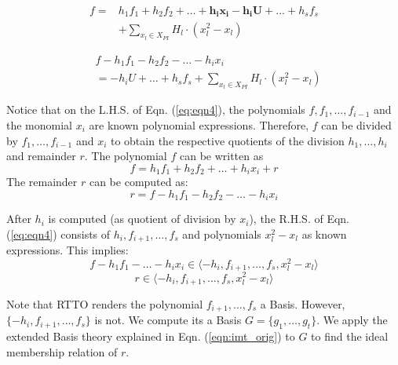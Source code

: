 \begin{equation}
\begin{split}
 f = & h_1f_1 + h_2f_2 + \dots+\boldsymbol{h_ix_i-h_iU}+\dots+h_sf_s \\
 & + \sum_{x_l \in X_{PI}} H_l \cdot(x_l^2-x_l)   
\end{split}
\label{eq:eqn3}
\end{equation}

\begin{equation}
\label{eq:eqn4}
\begin{split}
   & f - h_1f_1 - h_2f_2 - \dots-h_ix_i \\
   & = -h_iU+\dots+h_sf_s + \sum_{x_l \in X_{PI}} H_l \cdot(x_l^2-x_l) 
\end{split}
\end{equation}

Notice that on the L.H.S. of Eqn. (\ref{eq:eqn4}), the polynomials
$f, f_1,\dots,f_{i-1}$ and the monomial $x_i$ are known polynomial expressions. Therefore, $f$ can be divided by $f_1,\dots,f_{i-1}$ and $x_i$ to obtain the respective quotients of the division
$h_1,\dots,h_i$ and remainder $r$. The polynomial $f$ can be written as 
\begin{equation}
f = h_1f_1 + h_2f_2 + \dots + h_ix_i + r
\end{equation}
The remainder $r$ can be computed as:
\begin{equation}
r = f - h_1f_1 - h_2f_2 - \dots - h_ix_i
\label{eq:eqnr}
\end{equation}

After $h_i$ is computed (as quotient of division by $x_i$),
the R.H.S. of Eqn. (\ref{eq:eqn4}) consists of $h_i,f_{i+1},\dots,f_s$ and polynomials $x_l^2-x_l$ as known expressions. This
implies:
\vspace{-1mm}
\begin{equation}
f - h_1f_1 - \dots-h_ix_i \in \langle -h_i,f_{i+1},\dots,f_s,  x_l^2-x_l\rangle
\end{equation}
\vspace{-4mm}
\begin{equation}
r \in \langle -h_i,f_{i+1},\dots,f_s,  x_l^2-x_l\rangle
\label{eq:eqn5}
\end{equation}

Note that RTTO renders the polynomial $f_{i+1},\dots,f_s$ a \Grobner Basis. However, $\{-h_i,f_{i+1},\dots,f_s\}$ is not. We compute its a \Grobner Basis $G = \{g_1,\dots, g_t\}$. We apply the extended \Grobner Basis theory explained in Eqn. (\ref{eqn:imt_orig}) to $G$ to find the ideal membership relation of $r$.

